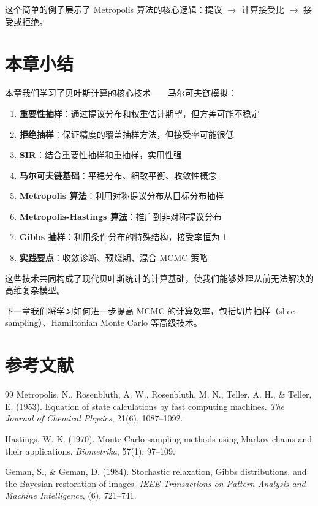 这个简单的例子展示了 Metropolis 算法的核心逻辑：提议 $\rightarrow$ 计算接受比 $\rightarrow$ 接受或拒绝。

\section{本章小结}

本章我们学习了贝叶斯计算的核心技术——马尔可夫链模拟：

\begin{enumerate}
  \item \textbf{重要性抽样}：通过提议分布和权重估计期望，但方差可能不稳定
  \item \textbf{拒绝抽样}：保证精度的覆盖抽样方法，但接受率可能很低
  \item \textbf{SIR}：结合重要性抽样和重抽样，实用性强
  \item \textbf{马尔可夫链基础}：平稳分布、细致平衡、收敛性概念
  \item \textbf{Metropolis 算法}：利用对称提议分布从目标分布抽样
  \item \textbf{Metropolis-Hastings 算法}：推广到非对称提议分布
  \item \textbf{Gibbs 抽样}：利用条件分布的特殊结构，接受率恒为 1
  \item \textbf{实践要点}：收敛诊断、预烧期、混合 MCMC 策略
\end{enumerate}

这些技术共同构成了现代贝叶斯统计的计算基础，使我们能够处理从前无法解决的高维复杂模型。

下一章我们将学习如何进一步提高 MCMC 的计算效率，包括切片抽样（slice sampling）、Hamiltonian Monte Carlo 等高级技术。

\section{参考文献}

\begin{thebibliography}{99}
   Metropolis, N., Rosenbluth, A. W., Rosenbluth, M. N., Teller, A. H., \& Teller, E. (1953). Equation of state calculations by fast computing machines. \textit{The Journal of Chemical Physics}, 21(6), 1087--1092.

   Hastings, W. K. (1970). Monte Carlo sampling methods using Markov chains and their applications. \textit{Biometrika}, 57(1), 97--109.

   Geman, S., \& Geman, D. (1984). Stochastic relaxation, Gibbs distributions, and the Bayesian restoration of images. \textit{IEEE Transactions on Pattern Analysis and Machine Intelligence}, (6), 721--741.
\end{thebibliography}

\endinput
